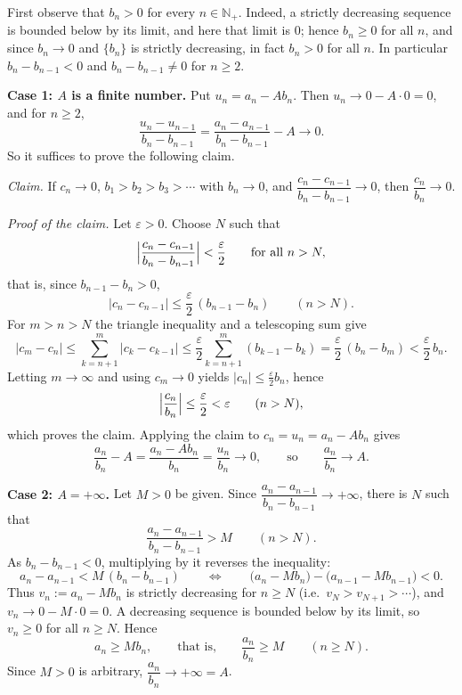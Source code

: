 \documentclass[11pt,a4paper]{article}
\newenvironment{solution}[1]{%
  \par\addvspace{1.7ex}%
  \noindent{\color{solutioncolor}\textbf{#1}}\hspace{0.55em}\ignorespaces}%
  {\par\addvspace{0.9ex}}
\begin{document}
\begin{solution}{Solution 2.3.15}\label{xs:2.3.15}
First observe that $b_n > 0$ for every $n \in \mathbb{N}_+$. Indeed, a strictly decreasing sequence is bounded below by its limit, and here that limit is $0$; hence $b_n \ge 0$ for all $n$, and since $b_n \to 0$ and $\{b_n\}$ is strictly decreasing, in fact $b_n > 0$ for all $n$. In particular $b_n - b_{n-1} < 0$ and $b_n - b_{n-1} \neq 0$ for $n \ge 2$.

\medskip
\noindent\textbf{Case 1: $A$ is a finite number.}
Put $u_n = a_n - A b_n$. Then $u_n \to 0 - A\cdot 0 = 0$, and for $n \ge 2$,
\[
\frac{u_n - u_{n-1}}{b_n - b_{n-1}}
= \frac{a_n - a_{n-1}}{b_n - b_{n-1}} - A \longrightarrow 0 .
\]
So it suffices to prove the following claim.

\emph{Claim.} If $c_n \to 0$, $b_1 > b_2 > b_3 > \cdots$ with $b_n \to 0$, and
$\dfrac{c_n - c_{n-1}}{b_n - b_{n-1}} \to 0$, then $\dfrac{c_n}{b_n} \to 0$.

\emph{Proof of the claim.} Let $\varepsilon > 0$. Choose $N$ such that
\[
\Bigl|\frac{c_n - c_{n-1}}{b_n - b_{n-1}}\Bigr| < \frac{\varepsilon}{2}
\qquad \text{for all } n > N,
\]
that is, since $b_{n-1} - b_n > 0$,
\[
|c_n - c_{n-1}| \le \frac{\varepsilon}{2}\,(b_{n-1} - b_n) \qquad (n > N).
\]
For $m > n > N$ the triangle inequality and a telescoping sum give
\[
|c_m - c_n| \le \sum_{k=n+1}^{m}|c_k - c_{k-1}|
\le \frac{\varepsilon}{2}\sum_{k=n+1}^{m}(b_{k-1} - b_k)
= \frac{\varepsilon}{2}\,(b_n - b_m) < \frac{\varepsilon}{2}\,b_n .
\]
Letting $m \to \infty$ and using $c_m \to 0$ yields $|c_n| \le \frac{\varepsilon}{2} b_n$, hence
\[
\Bigl|\frac{c_n}{b_n}\Bigr| \le \frac{\varepsilon}{2} < \varepsilon
\qquad (n > N),
\]
which proves the claim. Applying the claim to $c_n = u_n = a_n - A b_n$ gives
\[
\frac{a_n}{b_n} - A = \frac{a_n - A b_n}{b_n} = \frac{u_n}{b_n} \longrightarrow 0,
\qquad\text{so}\qquad \frac{a_n}{b_n} \longrightarrow A .
\]

\medskip
\noindent\textbf{Case 2: $A = +\infty$.}
Let $M > 0$ be given. Since $\dfrac{a_n - a_{n-1}}{b_n - b_{n-1}} \to +\infty$, there is $N$ such that
\[
\frac{a_n - a_{n-1}}{b_n - b_{n-1}} > M \qquad (n > N).
\]
As $b_n - b_{n-1} < 0$, multiplying by it reverses the inequality:
\[
a_n - a_{n-1} < M\,(b_n - b_{n-1})
\qquad\Longleftrightarrow\qquad
\bigl(a_n - M b_n\bigr) - \bigl(a_{n-1} - M b_{n-1}\bigr) < 0 .
\]
Thus $v_n := a_n - M b_n$ is strictly decreasing for $n \ge N$ (i.e.\ $v_{N} > v_{N+1} > \cdots$), and $v_n \to 0 - M \cdot 0 = 0$. A decreasing sequence is bounded below by its limit, so $v_n \ge 0$ for all $n \ge N$. Hence
\[
a_n \ge M b_n, \qquad\text{that is,}\qquad \frac{a_n}{b_n} \ge M \qquad (n \ge N).
\]
Since $M > 0$ is arbitrary, $\dfrac{a_n}{b_n} \to +\infty = A$.


\end{solution}
\end{document}
